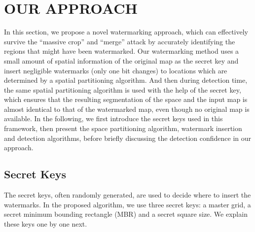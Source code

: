 \section{OUR APPROACH}
\label{sec:appr}

In this section, we propose a novel watermarking approach, 
which can effectively survive the ``massive crop'' and ``merge'' attack 
by accurately identifying the regions that might have been watermarked. 
Our watermarking method uses a small amount of spatial information of the original
map as the secret key and insert negligible watermarks (only one bit changes)
to locations which are determined by a spatial partitioning algorithm.
And then during detection time, the same spatial partitioning algorithm is used
with the help of the secret key, which ensures that the resulting segmentation of
the space and the input map is almost identical to that of the watermarked map,
even though no original map is available.
In the following, we first introduce the secret keys used in this framework,
then present the space partitioning algorithm, watermark insertion and detection
algorithms, before briefly discussing the detection confidence in our approach.

\subsection{Secret Keys}
The secret keys, often randomly generated, are used to decide where to insert the 
watermarks. In the proposed algorithm, we use three secret keys: 
a master grid, a secret minimum bounding rectangle (MBR) and
a secret square size. We explain these keys one by one next. 

